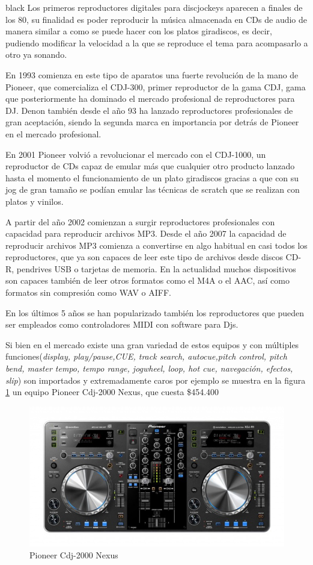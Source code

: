 \documentclass[11pt]{charter}
\begin{document}
\begin{consigna}{black}
Los primeros reproductores digitales para discjockeys aparecen a finales de los 80, su finalidad es poder reproducir la música almacenada en CDs de audio de manera similar a como se puede hacer con los platos giradiscos, es decir, pudiendo modificar la velocidad a la que se reproduce el tema para acompasarlo a otro ya sonando.

En 1993 comienza en este tipo de aparatos una fuerte revolución de la mano de Pioneer, que comercializa el CDJ-300, primer reproductor de la gama CDJ, gama que posteriormente ha dominado el mercado profesional de reproductores para DJ. Denon también desde el año 93 ha lanzado reproductores profesionales de gran aceptación, siendo la segunda marca en importancia por detrás de Pioneer en el mercado profesional.

En 2001 Pioneer volvió a revolucionar el mercado con el CDJ-1000, un reproductor de CDs capaz de emular más que cualquier otro producto lanzado hasta el momento el funcionamiento de un plato giradiscos gracias a que con su jog de gran tamaño se podían emular las técnicas de scratch que se realizan con platos y vinilos. 

A partir del año 2002 comienzan a surgir reproductores profesionales con capacidad para reproducir archivos MP3. Desde el año 2007 la capacidad de reproducir archivos MP3 comienza a convertirse en algo habitual en casi todos los reproductores, que ya son capaces de leer este tipo de archivos desde discos CD-R, pendrives USB o tarjetas de memoria. En la actualidad muchos dispositivos son capaces también de leer otros formatos como el M4A o el AAC, así como formatos sin compresión como WAV o AIFF.

En los últimos 5 años se han popularizado también los reproductores que pueden ser empleados como controladores MIDI con software para Djs.

Si bien en el mercado existe una gran variedad de estos equipos y con múltiples funciones(\textit{display, play/pause,CUE, track search, autocue,pitch control, pitch bend, master tempo, tempo range, jogwheel, loop, hot cue, navegación, efectos, slip}) son importados y extremadamente caros por ejemplo se muestra en la figura \ref{fig:Pioneer} un equipo Pioneer Cdj-2000 Nexus, que cuesta \$454.400

\begin{figure}[htpb]
\centering 
\includegraphics[width=.7\textwidth]{./Figuras/reproductordigital.jpeg}
\caption{Pioneer Cdj-2000 Nexus}
\label{fig:Pioneer}
\end{figure}


\end{consigna}
\end{document}
